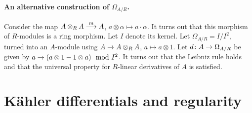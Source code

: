 \documentclass[a4paper,parskip=half,numbers=enddot, DIV=12]{scrreprt}
\begin{document}
\paragraph{An alternative construction of $\Omega_{A/R}$.} Consider the map $A\otimes_R A\morphism[m] A$, $a\otimes \alpha \mapsto a\cdot \alpha$. It turns out that this morphism of $R$-modules is a ring morphism. Let $I$ denote its kernel. Let $\Omega_{A/R} = I/I^2$, turned into an $A$-module using $A\morphism A\otimes_R A$, $a\mapsto a\otimes 1$. Let $d\colon A\morphism\Omega_{A/R}$ be given by $a\morphism (a\otimes 1-1\otimes a)\mod I^2$. It turns out that the Leibniz rule holds and that the universal property for $R$-linear derivatives of $A$ is satisfied.



\section{Kähler differentials and regularity}
\end{document}
